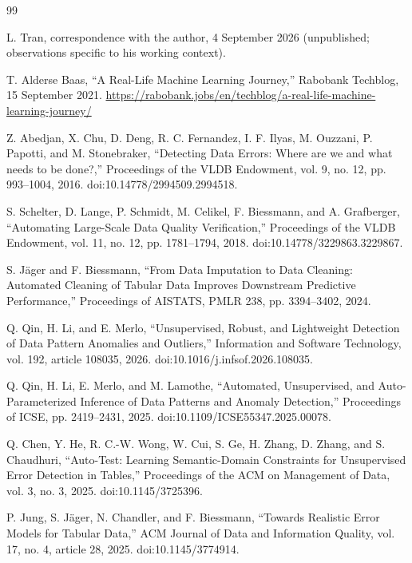 \documentclass[11pt,a4paper]{article}
\begin{document}
\begin{thebibliography}{99}
\small
\setlength{\itemsep}{2pt}
\setlength{\parskip}{0pt}

 L. Tran, correspondence with the author, 4 September 2026 (unpublished; observations specific to his working context).

 T. Alderse Baas, ``A Real-Life Machine Learning Journey,'' Rabobank Techblog, 15 September 2021. \url{https://rabobank.jobs/en/techblog/a-real-life-machine-learning-journey/}

 Z. Abedjan, X. Chu, D. Deng, R. C. Fernandez, I. F. Ilyas, M. Ouzzani, P. Papotti, and M. Stonebraker, ``Detecting Data Errors: Where are we and what needs to be done?,'' Proceedings of the VLDB Endowment, vol. 9, no. 12, pp. 993--1004, 2016. doi:10.14778/2994509.2994518.

 S. Schelter, D. Lange, P. Schmidt, M. Celikel, F. Biessmann, and A. Grafberger, ``Automating Large-Scale Data Quality Verification,'' Proceedings of the VLDB Endowment, vol. 11, no. 12, pp. 1781--1794, 2018. doi:10.14778/3229863.3229867.

 S. J\"ager and F. Biessmann, ``From Data Imputation to Data Cleaning: Automated Cleaning of Tabular Data Improves Downstream Predictive Performance,'' Proceedings of AISTATS, PMLR 238, pp. 3394--3402, 2024.

 Q. Qin, H. Li, and E. Merlo, ``Unsupervised, Robust, and Lightweight Detection of Data Pattern Anomalies and Outliers,'' Information and Software Technology, vol. 192, article 108035, 2026. doi:10.1016/j.infsof.2026.108035.

 Q. Qin, H. Li, E. Merlo, and M. Lamothe, ``Automated, Unsupervised, and Auto-Parameterized Inference of Data Patterns and Anomaly Detection,'' Proceedings of ICSE, pp. 2419--2431, 2025. doi:10.1109/ICSE55347.2025.00078.

 Q. Chen, Y. He, R. C.-W. Wong, W. Cui, S. Ge, H. Zhang, D. Zhang, and S. Chaudhuri, ``Auto-Test: Learning Semantic-Domain Constraints for Unsupervised Error Detection in Tables,'' Proceedings of the ACM on Management of Data, vol. 3, no. 3, 2025. doi:10.1145/3725396.

 P. Jung, S. J\"ager, N. Chandler, and F. Biessmann, ``Towards Realistic Error Models for Tabular Data,'' ACM Journal of Data and Information Quality, vol. 17, no. 4, article 28, 2025. doi:10.1145/3774914.


\end{thebibliography}
\end{document}
